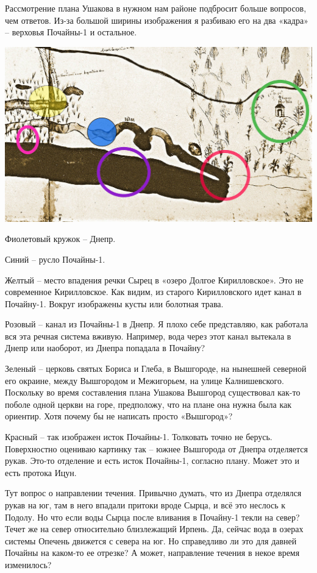 Рассмотрение плана Ушакова в нужном нам районе подбросит больше вопросов, чем ответов. Из-за большой ширины изображения я разбиваю его на два «кадра» – верховья Почайны-1 и остальное. 
\vspace*{\fill}
\begin{center}
\includegraphics[width=\linewidth]{chast-colebanie-osnov/pochayna/po1695-p2ist.jpg}
\end{center}
\vspace*{\fill}
\newpage

Фиолетовый кружок – Днепр.

Синий – русло Почайны-1.

Желтый – место впадения речки Сырец в «озеро Долгое Кирилловское». Это не современное Кирилловское. Как видим, из старого Кирилловского идет канал в Почай\-ну-1. Вокруг изображены кусты или болотная трава.

Розовый – канал из Почайны-1 в Днепр. Я плохо себе представляю, как работала вся эта речная система вживую. Например, вода через этот канал вытекала в Днепр или наоборот, из Днепра попадала в Почайну?

Зеленый – церковь святых Бориса и Глеба, в Вышгороде, на нынешней северной его окраине, между Вышгородом и Межигорьем, на улице Калнишевского. Поскольку во время составления плана Ушакова Вышгород существовал как-то поболе одной церкви на горе, предположу, что на плане она нужна была как ориентир. Хотя почему бы не написать просто «Вышгород»?

Красный – так изображен исток Почайны-1. Толковать точно не берусь. Поверхностно оцениваю картинку так – южнее Вышгорода от Днепра отделяется рукав. Это-то отделение и есть исток Почайны-1, согласно плану. Может это и есть протока Ицун.

Тут вопрос о направлении течения. Привычно думать, что из Днепра отделялся рукав на юг, там в него впадали притоки вроде Сырца, и всё это неслось к Подолу. Но что если воды Сырца после вливания в Почайну-1 текли на север? Течет же на север относительно близлежащий Ирпень. Да, сейчас вода в озерах системы Опечень движется с севера на юг. Но справедливо ли это для давней Почайны на каком-то ее отрезке? А может, направление течения в некое время изменилось?

